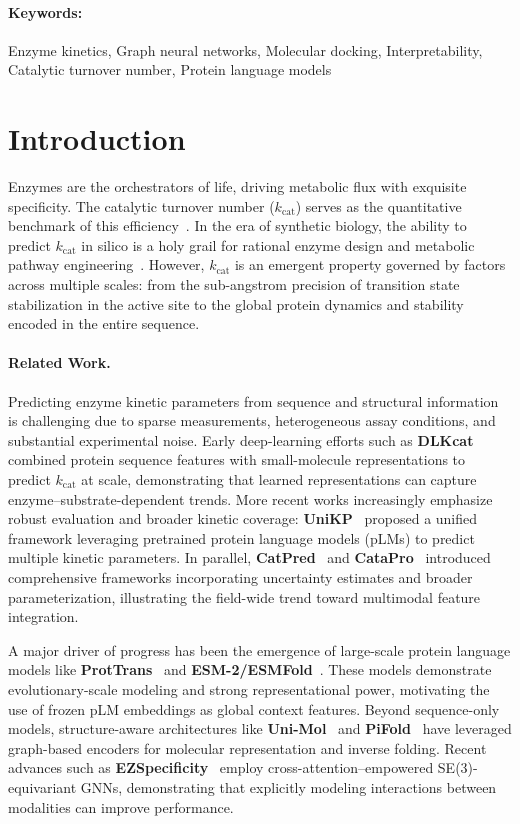 \documentclass[11pt]{article}
\begin{document}
\paragraph{Keywords:} Enzyme kinetics, Graph neural networks, Molecular docking, Interpretability, Catalytic turnover number, Protein language models

\section{Introduction}
\label{sec:intro}

Enzymes are the orchestrators of life, driving metabolic flux with exquisite specificity. The catalytic turnover number ($k_{\text{cat}}$) serves as the quantitative benchmark of this efficiency~\citep{srinivasan2023guide}. In the era of synthetic biology, the ability to predict $k_{\text{cat}}$ in silico is a holy grail for rational enzyme design and metabolic pathway engineering~\citep{yan2022intenzydb, yu2023unikp}. However, $k_{\text{cat}}$ is an emergent property governed by factors across multiple scales: from the sub-angstrom precision of transition state stabilization in the active site to the global protein dynamics and stability encoded in the entire sequence.


\paragraph{Related Work.}
Predicting enzyme kinetic parameters from sequence and structural information is challenging due to sparse measurements, heterogeneous assay conditions, and substantial experimental noise. Early deep-learning efforts such as \textbf{DLKcat}~\citep{dlkcat} combined protein sequence features with small-molecule representations to predict $k_{\text{cat}}$ at scale, demonstrating that learned representations can capture enzyme–substrate-dependent trends. More recent works increasingly emphasize robust evaluation and broader kinetic coverage: \textbf{UniKP}~\citep{yu2023unikp} proposed a unified framework leveraging pretrained protein language models (pLMs) to predict multiple kinetic parameters. In parallel, \textbf{CatPred}~\citep{catpred} and \textbf{CataPro}~\citep{catapro} introduced comprehensive frameworks incorporating uncertainty estimates and broader parameterization, illustrating the field-wide trend toward multimodal feature integration.

A major driver of progress has been the emergence of large-scale protein language models like \textbf{ProtTrans}~\citep{prottrans} and \textbf{ESM-2/ESMFold}~\citep{esmfold}. These models demonstrate evolutionary-scale modeling and strong representational power, motivating the use of frozen pLM embeddings as global context features. Beyond sequence-only models, structure-aware architectures like \textbf{Uni-Mol}~\citep{unimol} and \textbf{PiFold}~\citep{pifold} have leveraged graph-based encoders for molecular representation and inverse folding. Recent advances such as \textbf{EZSpecificity}~\citep{ezspecificity} employ cross-attention--empowered SE(3)-equivariant GNNs, demonstrating that explicitly modeling interactions between modalities can improve performance.
\end{document}
